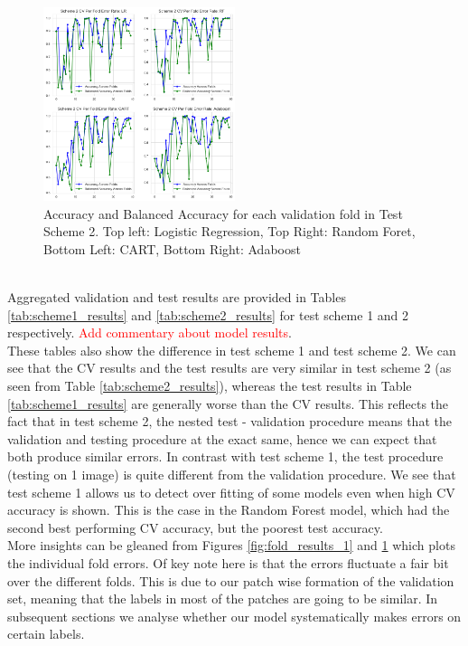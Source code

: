 \documentclass[11pt, letterpaper, journal]{IEEEtran}
\begin{document}
\begin{figure}[h]
\centering
\includegraphics[width=0.5\textwidth]{statics/test_Scheme2_fold_error.png}
\caption{Accuracy and Balanced Accuracy for each validation fold in Test Scheme 2. Top left: Logistic Regression, Top Right: Random Foret, Bottom Left: CART, Bottom Right: Adaboost}
\label{fig:fold_results_2}
\end{figure}

\\
Aggregated validation and test results are provided in Tables \ref{tab:scheme1_results} and \ref{tab:scheme2_results} for test scheme 1 and 2 respectively. \textcolor{red}{Add commentary about model results}.
\\
These tables also show the difference in test scheme 1 and test scheme 2. We can see that the CV results and the test results are very similar in test scheme 2 (as seen from Table \ref{tab:scheme2_results}), whereas the test results in Table \ref{tab:scheme1_results} are generally worse than the CV results. This reflects the fact that in test scheme 2, the nested test - validation procedure means that the validation and testing procedure at the exact same, hence we can expect that both produce similar errors. In contrast with test scheme 1, the test procedure (testing on 1 image) is quite different from the validation procedure. We see that test scheme 1 allows us to detect over fitting of some models even when high CV accuracy is shown. This is the case in the Random Forest model, which had the second best performing CV accuracy, but the poorest test accuracy.
\\
More insights can be gleaned from Figures \ref{fig:fold_results_1} and \ref{fig:fold_results_2} which plots the individual fold errors. Of key note here is that the errors fluctuate a fair bit over the different folds. This is due to our patch wise formation of the validation set, meaning that the labels in most of the patches are going to be similar. In subsequent sections we analyse whether our model systematically makes errors on certain labels. 
\end{document}
